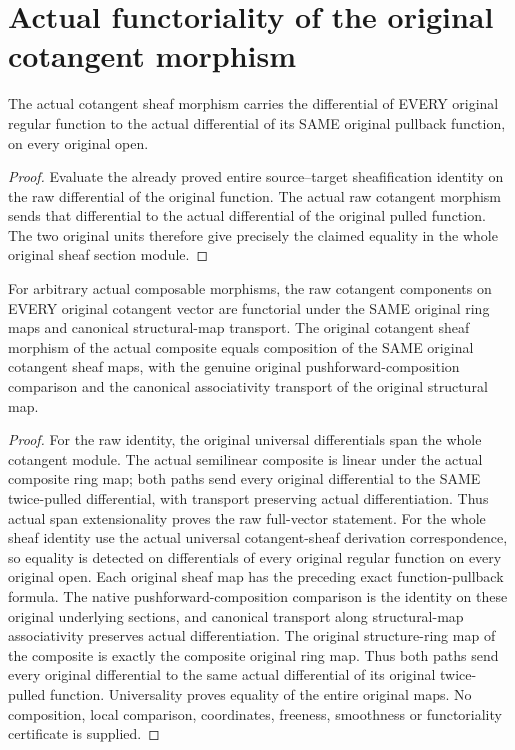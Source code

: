 \section{Actual functoriality of the original cotangent morphism}

\begin{lemma}\label{sc0-cotangent-functoriality:functions}
\leanok
{}
The actual cotangent sheaf morphism carries the differential of EVERY original regular function to the actual differential of its SAME original pullback function, on every original open.
\end{lemma}
\begin{proof}
Evaluate the already proved entire source--target sheafification identity on the raw differential of the original function. The actual raw cotangent morphism sends that differential to the actual differential of the original pulled function. The two original units therefore give precisely the claimed equality in the whole original sheaf section module.
\end{proof}

\begin{theorem}\label{sc0-cotangent-functoriality:composition}
\leanok
{}
For arbitrary actual composable morphisms, the raw cotangent components on EVERY original cotangent vector are functorial under the SAME original ring maps and canonical structural-map transport. The original cotangent sheaf morphism of the actual composite equals composition of the SAME original cotangent sheaf maps, with the genuine original pushforward-composition comparison and the canonical associativity transport of the original structural map.
\end{theorem}
\begin{proof}
For the raw identity, the original universal differentials span the whole cotangent module. The actual semilinear composite is linear under the actual composite ring map; both paths send every original differential to the SAME twice-pulled differential, with transport preserving actual differentiation. Thus actual span extensionality proves the raw full-vector statement. For the whole sheaf identity use the actual universal cotangent-sheaf derivation correspondence, so equality is detected on differentials of every original regular function on every original open. Each original sheaf map has the preceding exact function-pullback formula. The native pushforward-composition comparison is the identity on these original underlying sections, and canonical transport along structural-map associativity preserves actual differentiation. The original structure-ring map of the composite is exactly the composite original ring map. Thus both paths send every original differential to the same actual differential of its original twice-pulled function. Universality proves equality of the entire original maps. No composition, local comparison, coordinates, freeness, smoothness or functoriality certificate is supplied.
\end{proof}

